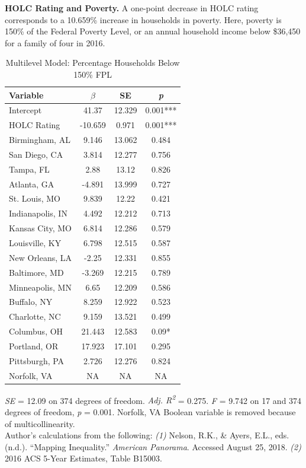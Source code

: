 \documentclass[paper=letter, fontsize=12pt]{scrartcl} %
\begin{document}
\begin{table}
	\textbf{HOLC Rating and Poverty.} A one-point decrease in HOLC rating corresponds to a 10.659\% increase in households in poverty. Here, poverty is 150\% of the Federal Poverty Level, or an annual household income below \$36,450 for a family of four in 2016.
	\caption{Multilevel Model: Percentage Households Below 150\% FPL}
	\begin{center}
		\begin{tabular}{|| l | c c c ||}
			\hline
			Variable & $\beta$ & SE & \textit{p}\\
			\hline \hline
			Intercept & 41.37 & 12.329 & 0.001***\\ 
			\hline 
			HOLC Rating & -10.659 & 0.971 & 0.001***\\ 
			\hline 
			Birmingham, AL & 9.146 & 13.062 & 0.484\\ 
			\hline 
			San Diego, CA & 3.814 & 12.277 & 0.756\\ 
			\hline 
			Tampa, FL & 2.88 & 13.12 & 0.826\\ 
			\hline 
			Atlanta, GA & -4.891 & 13.999 & 0.727\\ 
			\hline 
			St. Louis, MO & 9.839 & 12.22 & 0.421\\ 
			\hline 
			Indianapolis, IN & 4.492 & 12.212 & 0.713\\ 
			\hline 
			Kansas City, MO & 6.814 & 12.286 & 0.579\\ 
			\hline 
			Louisville, KY & 6.798 & 12.515 & 0.587\\ 
			\hline 
			New Orleans, LA & -2.25 & 12.331 & 0.855\\ 
			\hline 
			Baltimore, MD & -3.269 & 12.215 & 0.789\\ 
			\hline 
			Minneapolis, MN & 6.65 & 12.209 & 0.586\\ 
			\hline 
			Buffalo, NY & 8.259 & 12.922 & 0.523\\ 
			\hline 
			Charlotte, NC & 9.159 & 13.521 & 0.499\\ 
			\hline 
			Columbus, OH & 21.443 & 12.583 & 0.09*\\ 
			\hline 
			Portland, OR & 17.923 & 17.101 & 0.295\\ 
			\hline 
			Pittsburgh, PA & 2.726 & 12.276 & 0.824\\ 
			\hline 
			Norfolk, VA & NA & NA & NA\\ 
			\hline
		\end{tabular}
	\end{center}
\textit{SE} = 12.09 on 374 degrees of freedom. \textit{Adj. R\textsuperscript{2}} = 0.275. \textit{F} = 9.742 on 17 and 374 degrees of freedom, \textit{p} = 0.001. Norfolk, VA Boolean variable is removed because of multicollinearity.\\
Author's calculations from the following: \textit{(1)} Nelson, R.K., \& Ayers, E.L., eds. (n.d.). ``Mapping Inequality.'' \textit{American Panorama}. Accessed August 25, 2018. \textit{(2)} 2016 ACS 5-Year Estimates, Table B15003.
\end{table}
\end{document}
